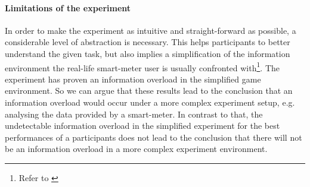 \paragraph{Limitations of the experiment}
In order to make the experiment as intuitive and straight-forward as possible, a considerable level of abstraction is necessary. This helps participants to better understand the given task, but also implies a simplification of the information environment the real-life smart-meter user is usually confronted with\footnote{Refer to \cite{Jacoby1984}}. The experiment has proven an information overload in the simplified game environment. So we can argue that these results lead to the conclusion that an information overload would occur under a more complex experiment setup, e.g. analysing the data provided by a smart-meter. 
In contrast to that, the undetectable information overload in the simplified experiment for the best performances of a participants does not lead to the conclusion that there will not be an information overload in a more complex experiment environment.


%
%
%
%

